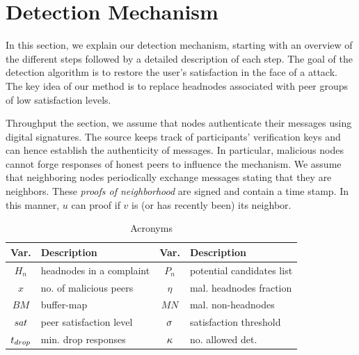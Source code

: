 \section{Detection Mechanism}
\label{sec:detection}


In this section, we explain our detection mechanism, starting with an overview of the different steps followed by a detailed description of each step.  
The goal of the detection algorithm is to restore the user's satisfaction in the face of a \drop attack. The key idea of our method is to replace headnodes associated with peer groups of low satisfaction levels. 

Throughput the section, we assume that nodes authenticate their messages using digital signatures. 
The source keeps track of participants' verification keys and can hence establish the authenticity of messages.
In particular, malicious nodes cannot forge responses of honest peers to influence the mechanism. 
We assume that neighboring nodes periodically exchange messages stating that they are neighbors.
These \emph{proofs of neighborhood} are signed and contain a time stamp. 
In this manner, $u$ can proof if $v$ is (or has recently been) its neighbor. 


\begin{table}[ht]
\center
\caption{Acronyms}
\begin{tabular}{|c|l||c|l|}
\hline

\bf{Var.} & \bf{Description}  & \bf{Var.} & \bf{Description} \\\hline\hline
$H_n$ & headnodes in a complaint & $P_n$ & potential candidates list \\\hline
$x$ & no. of malicious peers & $\eta$ & mal. headnodes fraction\\\hline
$BM$ & buffer-map & $MN$ & mal. non-headnodes \\\hline
$sat$ & peer satisfaction level & $\sigma$ & satisfaction threshold \\\hline
$t_{drop}$ & min. drop responses & $\kappa$ & no. allowed det. \\\hline
\end{tabular}
\label{tab:acronyms}
\vspace{-1mm}
\end{table}



